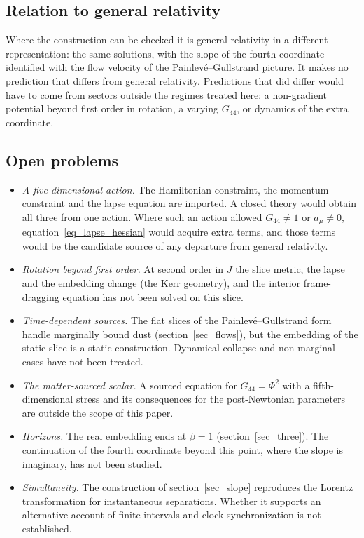 \documentclass[pdflatex,sn-mathphys-num]{sn-jnl}%
\theoremstyle{thmstyleone}%
\theoremstyle{thmstyletwo}%
\theoremstyle{thmstylethree}%
\begin{document}
\subsection{Relation to general relativity}

Where the construction can be checked it is general relativity in a different representation: the same solutions, with the slope of the fourth coordinate identified with the flow velocity of the Painlev\'e--Gullstrand picture. It makes no prediction that differs from general relativity. Predictions that did differ would have to come from sectors outside the regimes treated here: a non-gradient potential beyond first order in rotation, a varying $G_{44}$, or dynamics of the extra coordinate.

\subsection{Open problems}

\begin{itemize}
\item \emph{A five-dimensional action.} The Hamiltonian constraint, the momentum constraint and the lapse equation are imported. A closed theory would obtain all three from one action. Where such an action allowed $G_{44}\neq1$ or $a_\mu\neq0$, equation~\eqref{eq_lapse_hessian} would acquire extra terms, and those terms would be the candidate source of any departure from general relativity.
\item \emph{Rotation beyond first order.} At second order in $J$ the slice metric, the lapse and the embedding change (the Kerr geometry), and the interior frame-dragging equation has not been solved on this slice.
\item \emph{Time-dependent sources.} The flat slices of the Painlev\'e--Gullstrand form handle marginally bound dust (section~\ref{sec_flows}), but the embedding of the static slice is a static construction. Dynamical collapse and non-marginal cases have not been treated.
\item \emph{The matter-sourced scalar.} A sourced equation for $G_{44}=\Phi^2$ with a fifth-dimensional stress and its consequences for the post-Newtonian parameters are outside the scope of this paper.
\item \emph{Horizons.} The real embedding ends at $\beta=1$ (section~\ref{sec_three}). The continuation of the fourth coordinate beyond this point, where the slope is imaginary, has not been studied.
\item \emph{Simultaneity.} The construction of section~\ref{sec_slope} reproduces the Lorentz transformation for instantaneous separations. Whether it supports an alternative account of finite intervals and clock synchronization is not established.
\end{itemize}
\end{document}
